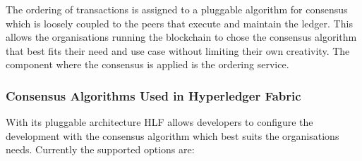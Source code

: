 The ordering of transactions is assigned to a pluggable algorithm for consensus which is loosely coupled to the peers that execute and maintain the ledger. This allows the organisations running the blockchain to chose the consensus algorithm that best fits their need and use case without limiting their own creativity. The component where the consensus is applied is the ordering service. 

\subsubsection{Consensus Algorithms Used in Hyperledger Fabric}

With its pluggable architecture HLF allows developers to configure the development with the consensus algorithm which best suits the organisations needs. Currently the supported options are: 

